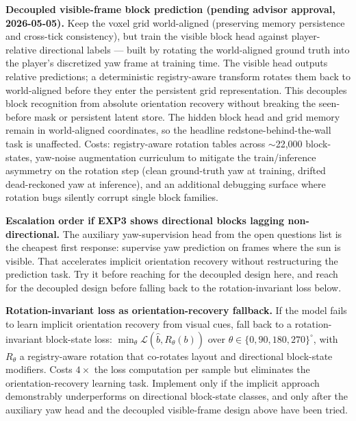 \documentclass[11pt,a4paper]{article}
\begin{document}
\begin{futurework}
\textbf{Decoupled visible-frame block prediction (pending advisor approval, 2026-05-05).} Keep the voxel grid world-aligned (preserving memory persistence and cross-tick consistency), but train the visible block head against player-relative directional labels --- built by rotating the world-aligned ground truth into the player's discretized yaw frame at training time. The visible head outputs relative predictions; a deterministic registry-aware transform rotates them back to world-aligned before they enter the persistent grid representation. This decouples block recognition from absolute orientation recovery without breaking the seen-before mask or persistent latent store. The hidden block head and grid memory remain in world-aligned coordinates, so the headline redstone-behind-the-wall task is unaffected. Costs: registry-aware rotation tables across $\sim$22{,}000 block-states, yaw-noise augmentation curriculum to mitigate the train/inference asymmetry on the rotation step (clean ground-truth yaw at training, drifted dead-reckoned yaw at inference), and an additional debugging surface where rotation bugs silently corrupt single block families.

\textbf{Escalation order if EXP3 shows directional blocks lagging non-directional.} The auxiliary yaw-supervision head from the open questions list is the cheapest first response: supervise yaw prediction on frames where the sun is visible. That accelerates implicit orientation recovery without restructuring the prediction task. Try it before reaching for the decoupled design here, and reach for the decoupled design before falling back to the rotation-invariant loss below.
\end{futurework}

\begin{futurework}
\textbf{Rotation-invariant loss as orientation-recovery fallback.} If the model fails to learn implicit orientation recovery from visual cues, fall back to a rotation-invariant block-state loss: $\min_\theta \mathcal{L}(\hat{b}, R_\theta(b))$ over $\theta \in \{0, 90, 180, 270\}^\circ$, with $R_\theta$ a registry-aware rotation that co-rotates layout and directional block-state modifiers. Costs $4\times$ the loss computation per sample but eliminates the orientation-recovery learning task. Implement only if the implicit approach demonstrably underperforms on directional block-state classes, and only after the auxiliary yaw head and the decoupled visible-frame design above have been tried.
\end{futurework}
\end{document}
